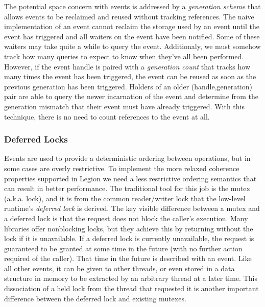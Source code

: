The potential space concern with events is addressed by a {\em generation scheme}
that allows events to be reclaimed and reused without tracking references.  The
naive implementation of an event cannot reclaim the storage used by an event
until the event has triggered and all waiters on the event have been
notified.  Some of these waiters may take quite a while to query the event.
Additionaly, we must somehow track how many queries to expect to know
when they've all been performed.  However, if the event handle is paired with a
{\em generation count} that tracks how many times the event has been triggered,
the event can be reused as soon as the previous generation has been triggered.
Holders of an older (handle,generation) pair are able to query the newer
incarnation of the event and determine from the generation mismatch that their
event must have already triggered.  With this technique, there is no need to
count references to the event at all. 

\subsubsection{Deferred Locks}
\label{subsec:defferedlocks}
Events are used to provide a deterministic ordering between operations, but in
some cases are overly restrictive.  To implement the more relaxed coherence
properties supported in Legion we need a less restrictive ordering semantics that
can result in better performance.  The traditional tool for this job is
the mutex (a.k.a. lock), and it is from the common reader/writer lock that
the low-level runtime's {\em deferred lock} is derived.  The key visible 
difference between a mutex and a deferred lock is that the request does not
block the caller's execution.  Many libraries offer nonblocking locks, but
they achieve this by returning without the lock if it is unavailable.  If
a deferred lock is currently unavailable, the request is guaranteed to be
granted at some time in the future (with no further action required of the 
caller).  That time in the future is described with an event.  Like all other
events, it can be given to other threads, or even stored
in a data structure in memory to be extracted by an arbitrary thread at a 
later time.  This dissociation of a held lock from the thread that
requested it is another important difference between the deferred lock and
existing mutexes.

